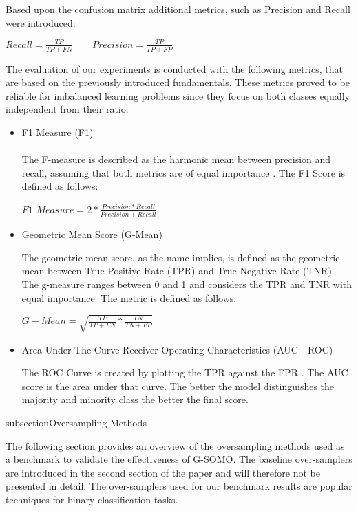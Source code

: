 \documentclass[parskip=full]{scrartcl}
\begin{document}
Based upon the confusion matrix additional metrics, such as Precision and Recall
\cite{Dalianis2018} were introduced: 

\begin{center} $ Recall = \frac{TP}{TP + FN} \qquad Precision =  \frac{TP}{TP + FP}$\end{center}

The evaluation of our experiments is conducted with the following metrics, that
are based on the previously introduced fundamentals. These metrics proved to be
reliable for imbalanced learning problems since they focus on both classes
equally independent from their ratio.

\begin{itemize}
  \item F1 Measure (F1) \\
  \\
  The F-measure is described as the harmonic mean between precision and recall,
  assuming that both metrics are of equal importance \cite{Guo2018}. The F1
  Score is defined as follows:
  
  \begin{center} $F1$  $Measure= 2 * \frac{Precision * Recall}{Precision + Recall}$ \end{center}
    
  \item Geometric Mean Score (G-Mean)
  
  The geometric mean score, as the name implies, is defined as the geometric
  mean between True Positive Rate (TPR) and True Negative Rate (TNR). The
  g-measure ranges between 0 and 1 and considers the TPR and TNR with equal
  importance. The metric is defined as follows:
  
   \begin{center} $G-Mean=  \sqrt{\frac{TP}{TP + FN} * \frac{TN}{TN + FP}}$ \end{center}
  
  \item Area Under The Curve Receiver Operating Characteristics (AUC - ROC)
  
  The ROC Curve is created by plotting the TPR against the FPR \cite{Hand2009}.
  The AUC score is the area under that curve. The better the model distinguishes
  the majority and minority class the better the final score. 

\end{itemize}

subsection{Oversampling Methods}

The following section provides an overview of the oversampling methods used as a
benchmark to validate the effectiveness of G-SOMO. The baseline over-samplers
are introduced in the second section of the paper and will therefore not be
presented in detail. The over-samplers used for our benchmark results are
popular techniques for binary classification tasks.
\end{document}
